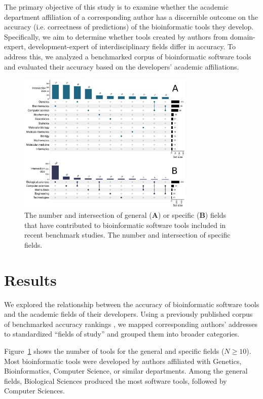 \documentclass[fleqn,10pt,doc,onecolumn]{SelfArx}%
\begin{document}
The primary objective of this study is to examine whether the academic
department affiliation of a corresponding author has a discernible
outcome on the accuracy (i.e. correctness of predictions) of the
bioinformatic tools they develop. Specifically, we aim to determine
whether tools created by authors from domain-expert,
development-expert of interdisciplinary fields differ in accuracy. To
address this, we analyzed a benchmarked corpus of bioinformatic
software tools and evaluated their accuracy based on the developers'
academic affiliations.


\begin{figure}[t!]
  \centering
  \includegraphics[width=0.75\textwidth]{upset-plots.pdf}
  \caption{ The number and intersection of general (\textbf{A}) or
  specific (\textbf{B}) fields that have contributed to bioinformatic
  software tools included in recent benchmark studies.  The number and
  intersection of specific fields.  }
\label{fig:fig1}
\end{figure}



\section*{Results}

We explored the relationship between the accuracy of bioinformatic
software tools and the academic fields of their developers. Using a
previously published corpus of benchmarked accuracy rankings
\cite{gardner2024}, we mapped corresponding authors' addresses to
standardized ``fields of study'' \cite{fields2014} and grouped them into
broader categories.

%
Figure~\ref{fig:fig1} shows the number of tools for the general and
specific fields ($N\ge 10$). Most bioinformatic tools were developed
by authors affiliated with Genetics, Bioinformatics, Computer Science,
or similar departments. Among the general fields, Biological Sciences
produced the most software tools, followed by Computer Sciences.
\end{document}
